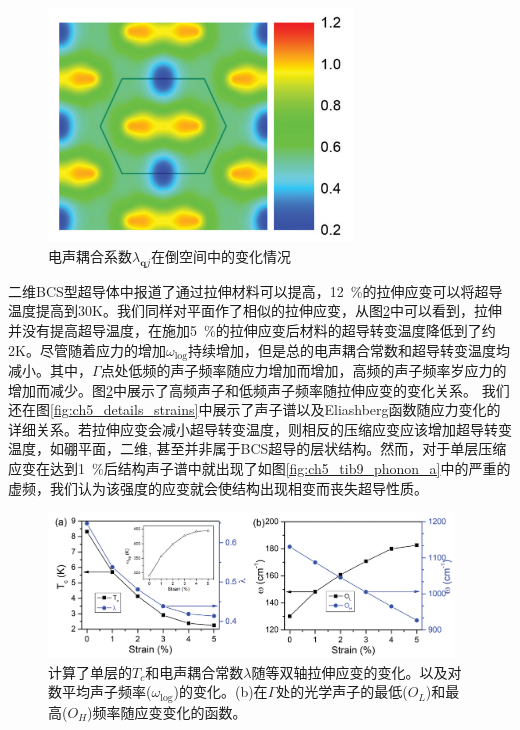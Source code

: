 \begin{figure}
  \includegraphics[width=0.72\textwidth]{figs/ch5_tib7_coupling.png}
  \centering
  \caption{电声耦合系数$\lambda_{\bm{q}j}$在倒空间中的变化情况}
  \label{fig:ch5_tib7_coupling}
\end{figure}

二维BCS型超导体中报道了通过拉伸材料可以提高，\SI{12}{\percent}的拉伸应变可以将超导温度提高到30K。我们同样对平面作了相似的拉伸应变，从图\ref{fig:ch5_tib7_strain}中可以看到，拉伸并没有提高超导温度，在施加\SI{5}{\percent}的拉伸应变后材料的超导转变温度降低到了约2K。尽管随着应力的增加$\omega_\mathrm{log}$持续增加，但是总的电声耦合常数和超导转变温度均减小。其中，$\Gamma$点处低频的声子频率随应力增加而增加，高频的声子频率岁应力的增加而减少。图\ref{fig:ch5_tib7_strain}中展示了高频声子和低频声子频率随拉伸应变的变化关系。
我们还在图\ref{fig:ch5_details_strains}中展示了声子谱以及Eliashberg函数随应力变化的详细关系。若拉伸应变会减小超导转变温度，则相反的压缩应变应该增加超导转变温度，如硼平面\cite{cheng2017suppressed}，二维\cite{liao2020doping},
甚至并非属于BCS超导的层状结构\cite{nie2009suppression}。然而，对于单层压缩应变在达到\SI{1}{\percent}后结构声子谱中就出现了如图\ref{fig:ch5_tib9_phonon_a}中的严重的虚频，我们认为该强度的应变就会使结构出现相变而丧失超导性质。

\begin{figure}
  \includegraphics[width=0.96\textwidth]{figs/ch5_tib7_strain.png}
  \centering
  \caption{计算了单层的$T_c$和电声耦合常数$\lambda$随等双轴拉伸应变的变化。以及对数平均声子频率($\omega_{\mathrm{log}}$)的变化。(b)在$\Gamma$处的光学声子的最低($O_L$)和最高($O_H$)频率随应变变化的函数。}
  \label{fig:ch5_tib7_strain}
\end{figure}

